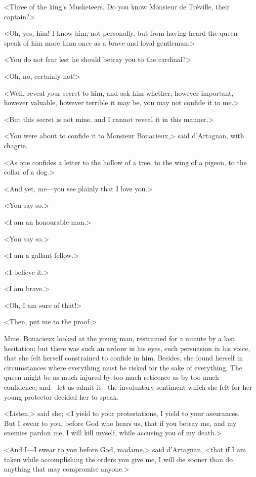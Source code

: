 <Three of the king's Musketeers. Do you know Monsieur de Tréville, their captain?> 

<Oh, yes, him! I know him; not personally, but from having heard the queen speak of him more than once as a brave and loyal gentleman.> 

<You do not fear lest he should betray you to the cardinal?> 

<Oh, no, certainly not!> 

<Well, reveal your secret to him, and ask him whether, however important, however valuable, however terrible it may be, you may not confide it to me.> 

<But this secret is not mine, and I cannot reveal it in this manner.> 

<You were about to confide it to Monsieur Bonacieux,> said d'Artagnan, with chagrin. 

<As one confides a letter to the hollow of a tree, to the wing of a pigeon, to the collar of a dog.> 

<And yet, me---you see plainly that I love you.> 

<You say so.> 

<I am an honourable man.> 

<You say so.> 

<I am a gallant fellow.> 

<I believe it.> 

<I am brave.> 

<Oh, I am sure of that!> 

<Then, put me to the proof.> 

Mme. Bonacieux looked at the young man, restrained for a minute by a last hesitation; but there was such an ardour in his eyes, such persuasion in his voice, that she felt herself constrained to confide in him. Besides, she found herself in circumstances where everything must be risked for the sake of everything. The queen might be as much injured by too much reticence as by too much confidence; and---let us admit it---the involuntary sentiment which she felt for her young protector decided her to speak. 

<Listen,> said she; <I yield to your protestations, I yield to your assurances. But I swear to you, before God who hears us, that if you betray me, and my enemies pardon me, I will kill myself, while accusing you of my death.> 

<And I---I swear to you before God, madame,> said d'Artagnan, <that if I am taken while accomplishing the orders you give me, I will die sooner than do anything that may compromise anyone.> 

